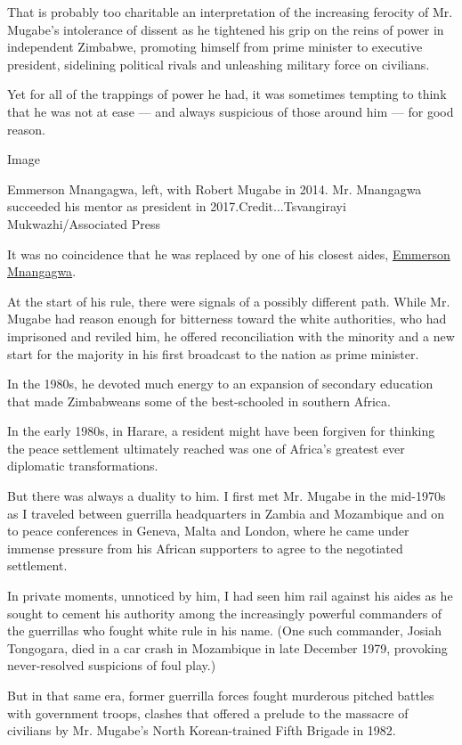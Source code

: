 That is probably too charitable an interpretation of the increasing
ferocity of Mr. Mugabe's intolerance of dissent as he tightened his grip
on the reins of power in independent Zimbabwe, promoting himself from
prime minister to executive president, sidelining political rivals and
unleashing military force on civilians.

Yet for all of the trappings of power he had, it was sometimes tempting
to think that he was not at ease --- and always suspicious of those
around him --- for good reason.

Image

Emmerson Mnangagwa, left, with Robert Mugabe in 2014. Mr. Mnangagwa
succeeded his mentor as president in 2017.Credit...Tsvangirayi
Mukwazhi/Associated Press

It was no coincidence that he was replaced by one of his closest aides,
\href{https://www.nytimes.com/2019/08/10/world/africa/zimbabwe-president-emmerson-mnangagwa-mugabe.html}{Emmerson
Mnangagwa}.

At the start of his rule, there were signals of a possibly different
path. While Mr. Mugabe had reason enough for bitterness toward the white
authorities, who had imprisoned and reviled him, he offered
reconciliation with the minority and a new start for the majority in his
first broadcast to the nation as prime minister.

In the 1980s, he devoted much energy to an expansion of secondary
education that made Zimbabweans some of the best-schooled in southern
Africa.

In the early 1980s, in Harare, a resident might have been forgiven for
thinking the peace settlement ultimately reached was one of Africa's
greatest ever diplomatic transformations.

But there was always a duality to him. I first met Mr. Mugabe in the
mid-1970s as I traveled between guerrilla headquarters in Zambia and
Mozambique and on to peace conferences in Geneva, Malta and London,
where he came under immense pressure from his African supporters to
agree to the negotiated settlement.

In private moments, unnoticed by him, I had seen him rail against his
aides as he sought to cement his authority among the increasingly
powerful commanders of the guerrillas who fought white rule in his name.
(One such commander, Josiah Tongogara, died in a car crash in Mozambique
in late December 1979, provoking never-resolved suspicions of foul
play.)

But in that same era, former guerrilla forces fought murderous pitched
battles with government troops, clashes that offered a prelude to the
massacre of civilians by Mr. Mugabe's North Korean-trained Fifth Brigade
in 1982.

